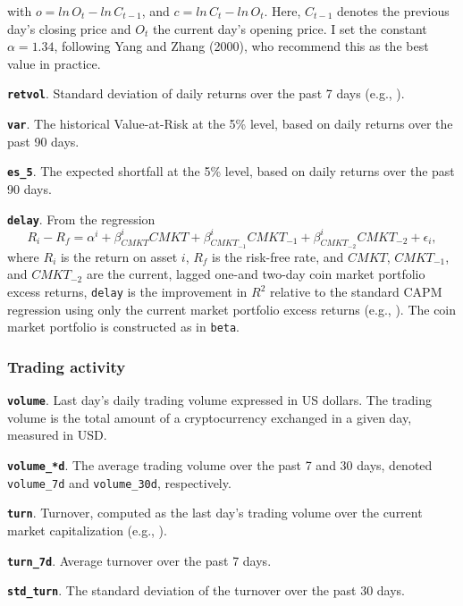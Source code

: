 \documentclass[
  12pt,
  a4paper,
  openany]{scrbook}
\begin{document}
with \(o = ln\,O_t - ln\,C_{t-1}\), and \(c = ln\,C_t - ln\,O_t\). Here,
\(C_{t-1}\) denotes the previous day's closing price and \(O_t\) the
current day's opening price. I set the constant \(\alpha = 1.34\),
following Yang and Zhang (2000), who recommend this as the best value in
practice.

\textbf{\texttt{retvol}}. Standard deviation of daily returns over the
past 7 days (e.g., ).

\textbf{\texttt{var}}. The historical Value-at-Risk at the 5\% level,
based on daily returns over the past 90 days.

\textbf{\texttt{es\_5}}. The expected shortfall at the 5\% level, based
on daily returns over the past 90 days.

\textbf{\texttt{delay}}. From the regression \[
R_i - R_f = \alpha^i + \beta^i_{CMKT}CMKT + \beta^i_{CMKT_{-1}}CMKT_{-1} + \beta^i_{CMKT_{-2}}CMKT_{-2} + \epsilon_i, 
\] where \(R_i\) is the return on asset \(i\), \(R_f\) is the risk-free
rate, and \(CMKT\), \(CMKT_{-1}\), and \(CMKT_{-2}\) are the current,
lagged one-and two-day coin market portfolio excess returns,
\texttt{delay} is the improvement in \(R^2\) relative to the standard
CAPM regression using only the current market portfolio excess returns
(e.g., ).
The coin market portfolio is constructed as in \texttt{beta}.

\subsubsection{Trading activity}\label{trading-activity}

\textbf{\texttt{volume}}. Last day's daily trading volume expressed in
US dollars. The trading volume is the total amount of a cryptocurrency
exchanged in a given day, measured in USD.

\textbf{\texttt{volume\_*d}}. The average trading volume over the past 7
and 30 days, denoted \texttt{volume\_7d} and \texttt{volume\_30d},
respectively.

\textbf{\texttt{turn}}. Turnover, computed as the last day's trading
volume over the current market capitalization (e.g.,
).

\textbf{\texttt{turn\_7d}}. Average turnover over the past 7 days.

\textbf{\texttt{std\_turn}}. The standard deviation of the turnover over
the past 30 days.
\end{document}
